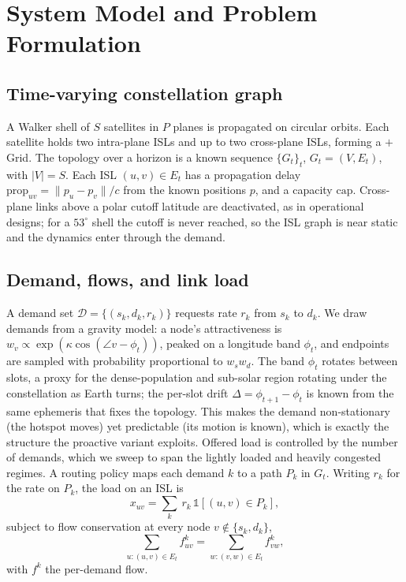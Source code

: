 \documentclass[journal]{IEEEtran}
\newcommand{\prop}{\mathrm{prop}}
\newcommand{\cpc}{\mathrm{cap}}
\begin{document}
\section{System Model and Problem Formulation}\label{sec:model}
\subsection{Time-varying constellation graph}
A Walker shell of $S$ satellites in $P$ planes is propagated on circular orbits. Each
satellite holds two intra-plane ISLs and up to two cross-plane ISLs, forming a $+$Grid. The topology over a horizon is a known sequence
$\{G_t\}_{t}$, $G_t=(V,E_t)$, with $|V|=S$. Each ISL $(u,v)\in E_t$ has a
propagation delay $\prop_{uv}=\lVert p_u-p_v\rVert/c$ from the known positions $p$, and
a capacity $\cpc$. Cross-plane links above a polar cutoff latitude are deactivated, as
in operational designs; for a $53^\circ$ shell the cutoff is never reached, so the ISL
graph is near static and the dynamics enter through the demand.

\subsection{Demand, flows, and link load}
A demand set $\mathcal{D}=\{(s_k,d_k,r_k)\}$ requests rate $r_k$ from $s_k$ to $d_k$.
We draw demands from a gravity model: a node's attractiveness is
$w_v\propto\exp(\kappa\cos(\angle v-\phi_t))$, peaked on a longitude band $\phi_t$, and
endpoints are sampled with probability proportional to $w_{s}w_{d}$. The band $\phi_t$
rotates between slots, a proxy for the dense-population and sub-solar region rotating
under the constellation as Earth turns; the per-slot drift $\Delta=\phi_{t+1}-\phi_t$ is
known from the same ephemeris that fixes the topology. This makes the demand
non-stationary (the hotspot moves) yet predictable (its motion is known), which is
exactly the structure the proactive variant exploits. Offered load is controlled by the
number of demands, which we sweep to span the lightly loaded and heavily congested
regimes. A routing
policy maps each demand $k$ to a path $P_k$ in $G_t$. Writing $r_k$ for the rate on
$P_k$, the load on an ISL is
\begin{equation}
x_{uv}=\sum_{k}\ r_k\,\mathbb{1}\!\left[(u,v)\in P_k\right],
\label{eq:load}
\end{equation}
subject to flow conservation at every node $v\notin\{s_k,d_k\}$,
\begin{equation}
\sum_{u:(u,v)\in E_t} f^{k}_{uv}=\sum_{w:(v,w)\in E_t} f^{k}_{vw},
\label{eq:conserv}
\end{equation}
with $f^{k}$ the per-demand flow.
\end{document}
